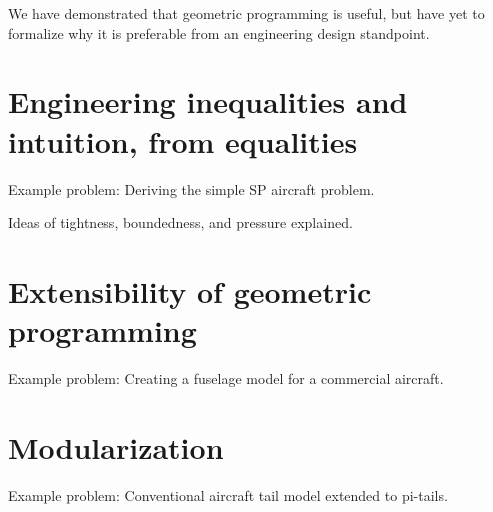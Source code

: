 \documentclass{aiaa-pretty}
\begin{document}
We have demonstrated that geometric programming is useful, but have yet to formalize why it is preferable from an engineering design standpoint. 

\section{Engineering inequalities and intuition, from equalities}

Example problem: Deriving the simple SP aircraft problem. 

Ideas of tightness, boundedness, and pressure explained. 

\section{Extensibility of geometric programming}

Example problem: Creating a fuselage model for a commercial aircraft. 

\section{Modularization}

Example problem: Conventional aircraft tail model extended to pi-tails. 
\end{document}

